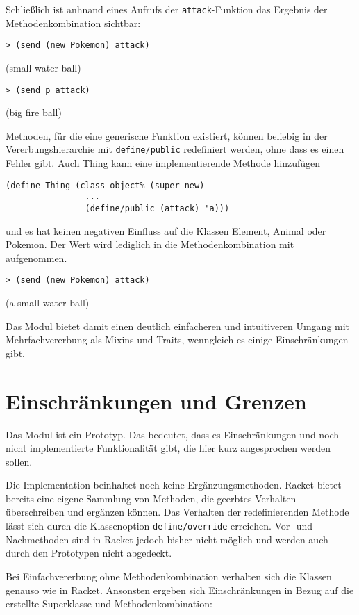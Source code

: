 Schließlich ist anhnand eines Aufrufs der \texttt{attack}-Funktion das Ergebnis der Methodenkombination sichtbar:

\begin{lstlisting}
> (send (new Pokemon) attack)
\end{lstlisting}
{\rsymbol (small water ball)}

\begin{lstlisting}
> (send p attack)
\end{lstlisting}
{\rsymbol (big fire ball)}

Methoden, für die eine generische Funktion existiert, können beliebig in der Vererbungshierarchie mit \texttt{define/public} redefiniert werden, ohne dass es einen Fehler gibt. Auch Thing kann eine implementierende Methode hinzufügen

\begin{lstlisting}
(define Thing (class object% (super-new)
                ...
                (define/public (attack) 'a)))
\end{lstlisting}

und es hat keinen negativen Einfluss auf die Klassen Element, Animal oder Pokemon. Der Wert wird lediglich in die Methodenkombination mit aufgenommen.

\begin{lstlisting}
> (send (new Pokemon) attack)
\end{lstlisting}
{\rsymbol (a small water ball)}

Das Modul bietet damit einen deutlich einfacheren und intuitiveren Umgang mit Mehrfachvererbung als Mixins und Traits, wenngleich es einige Einschränkungen gibt.

\section{Einschränkungen und Grenzen}
Das Modul ist ein Prototyp. Das bedeutet, dass es  Einschränkungen und noch nicht implementierte Funktionalität gibt, die hier kurz angesprochen werden sollen.

Die Implementation beinhaltet noch keine Ergänzungsmethoden. Racket bietet bereits eine eigene Sammlung von Methoden, die geerbtes Verhalten überschreiben und ergänzen können. Das Verhalten der redefinierenden Methode lässt sich durch die Klassenoption \texttt{define/override} erreichen. Vor- und Nachmethoden sind in Racket jedoch bisher nicht möglich und werden auch durch den Prototypen nicht abgedeckt.

Bei Einfachvererbung ohne Methodenkombination verhalten sich die Klassen genauso wie in Racket. Ansonsten ergeben sich Einschränkungen in Bezug auf die erstellte Superklasse und Methodenkombination:

